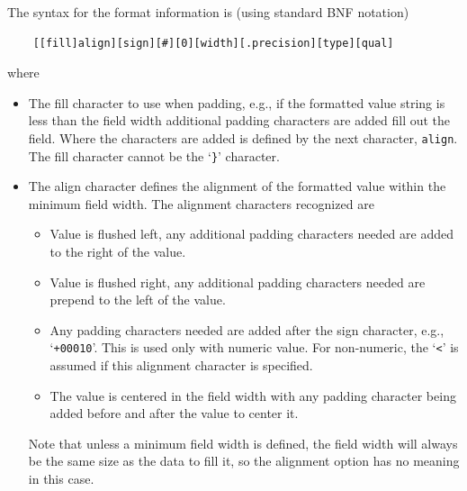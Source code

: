 The syntax for the format information is (using standard BNF notation)
\begin{small}
\begin{center}
\begin{verbatim}
    [[fill]align][sign][#][0][width][.precision][type][qual]
\end{verbatim}
\end{center}
\end{small}
where
\begin{itemize}
\item[\textit{fill}]
    The fill character to use when padding, e.g., if the formatted value
    string is less than the field width additional padding characters
    are added fill out the field.  Where the characters are added is
    defined by the next character, \texttt{align}.  The fill character
    cannot be the `\texttt{\}}' character.

\item[\textit{align}]
    The align character defines the alignment of the formatted value
    within the minimum field width.  The alignment characters recognized are
    \begin{itemize}
    \item[`\texttt{<}'] Value is flushed left, any additional padding
        characters needed are added to the right of the value.
    \item[`\texttt{>}'] Value is flushed right, any additional padding
        characters needed are prepend to the left of the value.
    \item[`\texttt{=}'] Any padding characters needed are added after the
        sign character, e.g., `\texttt{+00010}'.  This is used only with
        numeric value.  For non-numeric, the `\texttt{<}' is assumed if this
        alignment character is specified.
    \item[`\texttt{\^}'] The value is centered in the field width with any
        padding character being added before and after the value to center
        it.
    \end{itemize}
    Note that unless a minimum field width is defined, the field width
    will always be the same size as the data to fill it, so the
    alignment option has no meaning in this case.


\end{itemize}

